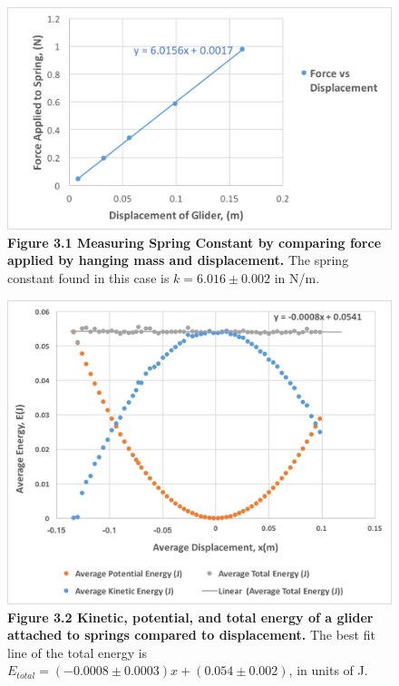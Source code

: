 \documentclass[11pt]{report}
\begin{document}
\begin{figure}[h!]
    \includegraphics[width=\linewidth]{SpringForce.png}
    \captionsetup{labelformat=empty}
    \caption{\textbf{Figure 3.1 Measuring Spring Constant by comparing force
    applied by hanging mass and displacement.} The spring constant found in this
case is \(k = 6.016 \pm 0.002\) in N/m.}
\end{figure}

\begin{figure}[h!]
    \includegraphics[width=\linewidth]{Energy.png}
    \captionsetup[labelformat=empty]
    \caption{\textbf{Figure 3.2 Kinetic, potential, and total energy of a glider
    attached to springs compared to displacement.}  The best fit line of the
total energy is \(E_{total} = (-0.0008 \pm 0.0003)x + (0.054 \pm 0.002)\), in
units of J.}
\end{figure}
\end{document}
